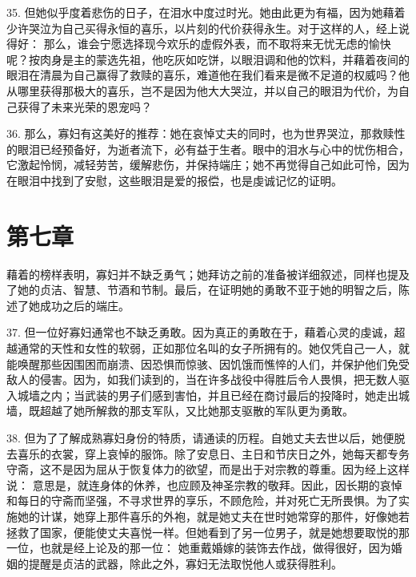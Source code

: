 35. 但她似乎度着悲伤的日子，在泪水中度过时光。她由此更为有福，因为她藉着少许哭泣为自己买得永恒的喜乐，以片刻的代价获得永生。对于这样的人，经上说得好： 那么，谁会宁愿选择现今欢乐的虚假外表，而不取将来无忧无虑的愉快呢？按肉身是主的蒙选先祖，他吃灰如吃饼，以眼泪调和他的饮料，并藉着夜间的眼泪在清晨为自己赢得了救赎的喜乐，难道他在我们看来是微不足道的权威吗？他从哪里获得那极大的喜乐，岂不是因为他大大哭泣，并以自己的眼泪为代价，为自己获得了未来光荣的恩宠吗？\par

36. 那么，寡妇有这美好的推荐：她在哀悼丈夫的同时，也为世界哭泣，那救赎性的眼泪已经预备好，为逝者流下，必有益于生者。眼中的泪水与心中的忧伤相合，它激起怜悯，减轻劳苦，缓解悲伤，并保持端庄；她不再觉得自己如此可怜，因为在眼泪中找到了安慰，这些眼泪是爱的报偿，也是虔诚记忆的证明。\par


\section{第七章}

藉着的榜样表明，寡妇并不缺乏勇气；她拜访之前的准备被详细叙述，同样也提及了她的贞洁、智慧、节酒和节制。最后，在证明她的勇敢不亚于她的明智之后，陈述了她成功之后的端庄。\par

37. 但一位好寡妇通常也不缺乏勇敢。因为真正的勇敢在于，藉着心灵的虔诚，超越通常的天性和女性的软弱，正如那位名叫的女子所拥有的。她仅凭自己一人，就能唤醒那些因围困而崩溃、因恐惧而惊骇、因饥饿而憔悴的人们，并保护他们免受敌人的侵害。因为，如我们读到的，当在许多战役中得胜后令人畏惧，把无数人驱入城墙之内；当武装的男子们感到害怕，并且已经在商讨最后的投降时，她走出城墙，既超越了她所解救的那支军队，又比她那支驱散的军队更为勇敢。\par

38. 但为了了解成熟寡妇身份的特质，请通读的历程。自她丈夫去世以后，她便脱去喜乐的衣裳，穿上哀悼的服饰。除了安息日、主日和节庆日之外，她每天都专务守斋，这不是因为屈从于恢复体力的欲望，而是出于对宗教的尊重。因为经上这样说： 意思是，就连身体的休养，也应顾及神圣宗教的敬拜。因此，因长期的哀悼和每日的守斋而坚强，不寻求世界的享乐，不顾危险，并对死亡无所畏惧。为了实施她的计谋，她穿上那件喜乐的外袍，就是她丈夫在世时她常穿的那件，好像她若拯救了国家，便能使丈夫喜悦一样。但她看到了另一位男子，就是她想要取悦的那一位，也就是经上论及的那一位： 她重戴婚嫁的装饰去作战，做得很好，因为婚姻的提醒是贞洁的武器，除此之外，寡妇无法取悦他人或获得胜利。\par

